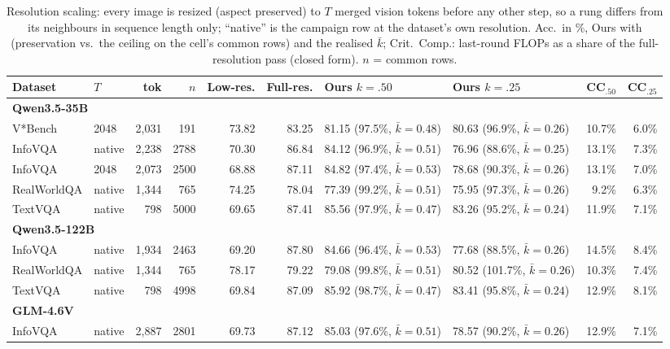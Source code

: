 \begin{table}[t]
\centering
\small
\caption{Resolution scaling: every image is resized (aspect preserved) to $T$ merged vision tokens before any other step, so a rung differs from its neighbours in sequence length only; ``native'' is the campaign row at the dataset's own resolution. Acc.\ in \%, Ours with (preservation vs.\ the ceiling on the cell's common rows) and the realised $\bar k$; Crit.\ Comp.: last-round FLOPs as a share of the full-resolution pass (closed form). $n$ = common rows.}
\label{tab:scaling}
\begin{tabular}{llrrrrllrr}
\toprule
Dataset & $T$ & tok & $n$ & Low-res. & Full-res. & Ours $k{=}.50$ & Ours $k{=}.25$ & CC$_{.50}$ & CC$_{.25}$ \\
\midrule
\multicolumn{10}{l}{\textbf{Qwen3.5-35B}} \\
V*Bench & 2048 & 2,031 & 191 & 73.82 & 83.25 & 81.15 (97.5\%, $\bar k{=}0.48$) & 80.63 (96.9\%, $\bar k{=}0.26$) & 10.7\% & 6.0\% \\
InfoVQA & native & 2,238 & 2788 & 70.30 & 86.84 & 84.12 (96.9\%, $\bar k{=}0.51$) & 76.96 (88.6\%, $\bar k{=}0.25$) & 13.1\% & 7.3\% \\
InfoVQA & 2048 & 2,073 & 2500 & 68.88 & 87.11 & 84.82 (97.4\%, $\bar k{=}0.53$) & 78.68 (90.3\%, $\bar k{=}0.26$) & 13.1\% & 7.0\% \\
RealWorldQA & native & 1,344 & 765 & 74.25 & 78.04 & 77.39 (99.2\%, $\bar k{=}0.51$) & 75.95 (97.3\%, $\bar k{=}0.26$) & 9.2\% & 6.3\% \\
TextVQA & native & 798 & 5000 & 69.65 & 87.41 & 85.56 (97.9\%, $\bar k{=}0.47$) & 83.26 (95.2\%, $\bar k{=}0.24$) & 11.9\% & 7.1\% \\
\midrule
\multicolumn{10}{l}{\textbf{Qwen3.5-122B}} \\
InfoVQA & native & 1,934 & 2463 & 69.20 & 87.80 & 84.66 (96.4\%, $\bar k{=}0.53$) & 77.68 (88.5\%, $\bar k{=}0.26$) & 14.5\% & 8.4\% \\
RealWorldQA & native & 1,344 & 765 & 78.17 & 79.22 & 79.08 (99.8\%, $\bar k{=}0.51$) & 80.52 (101.7\%, $\bar k{=}0.26$) & 10.3\% & 7.4\% \\
TextVQA & native & 798 & 4998 & 69.84 & 87.09 & 85.92 (98.7\%, $\bar k{=}0.47$) & 83.41 (95.8\%, $\bar k{=}0.24$) & 12.9\% & 8.1\% \\
\midrule
\multicolumn{10}{l}{\textbf{GLM-4.6V}} \\
InfoVQA & native & 2,887 & 2801 & 69.73 & 87.12 & 85.03 (97.6\%, $\bar k{=}0.51$) & 78.57 (90.2\%, $\bar k{=}0.26$) & 12.9\% & 7.1\% \\

\end{tabular}
\end{table}
